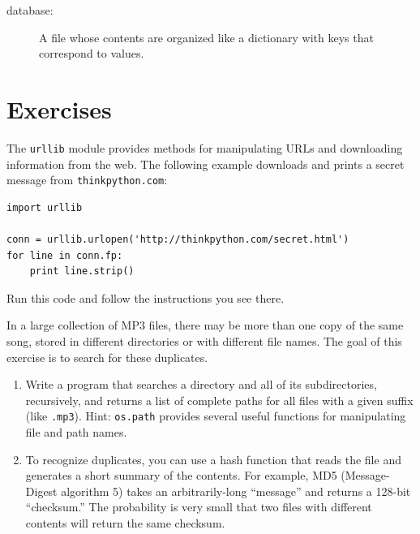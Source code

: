 \documentclass[10pt]{book}
\begin{document}
{\begin{description}
\item[database:] A file whose contents are organized like a dictionary
with keys that correspond to values.

\end{description}


\section{Exercises}

\begin{ex}
\label{urllib}


The {\tt urllib} module provides methods for manipulating URLs
and downloading information from the web.  The following example
downloads and prints a secret message from {\tt thinkpython.com}:

\beforeverb
\begin{verbatim}
import urllib

conn = urllib.urlopen('http://thinkpython.com/secret.html')
for line in conn.fp:
    print line.strip()
\end{verbatim}
\afterverb

Run this code and follow the instructions you see there.


\end{ex}

\begin{ex}
\label{checksum}


In a large collection of MP3 files, there may be more than one
copy of the same song, stored in different directories or with
different file names.  The goal of this exercise is to search for
these duplicates.

\begin{enumerate}

\item Write a program that searches a directory and all of its
subdirectories, recursively, and returns a list of complete paths
for all files with a given suffix (like {\tt .mp3}).
Hint: {\tt os.path} provides several useful functions for
manipulating file and path names.


\item To recognize duplicates, you can use a hash function that
reads the file and generates a short summary
of the contents.  For example,
MD5 (Message-Digest algorithm 5) takes an arbitrarily-long
``message'' and returns a 128-bit ``checksum.''  The probability
is very small that two files with different contents will
return the same checksum.


\end{enumerate}
\end{ex}}
\end{document}

